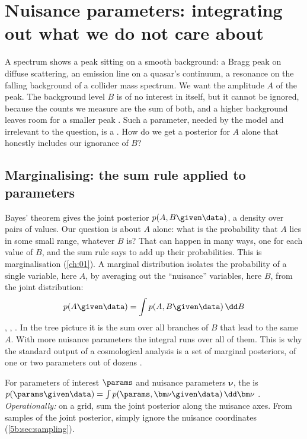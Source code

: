 \section{Nuisance parameters: integrating out what we do not care about}
\label{5b:sec:marginal}

A spectrum shows a peak sitting on a smooth background: a Bragg peak on diffuse
scattering, an emission line on a quasar's continuum, a resonance on the falling
background of a collider mass spectrum. We want the amplitude $A$ of the peak. The
background level $B$ is of no interest in itself, but it cannot be ignored, because the
counts we measure are the sum of both, and a higher background leaves room for a
smaller peak . Such a parameter, needed by the model and irrelevant
to the question, is a . How do we get a posterior for $A$
alone that honestly includes our ignorance of $B$?

\subsection{Marginalising: the sum rule applied to parameters}

Bayes' theorem gives the joint posterior $p(A,B\given\data)$, a density over pairs of
values. Our question is about $A$ alone: what is the probability that $A$ lies in some
small range, whatever $B$ is? That can happen in many ways, one for each value of $B$,
and the sum rule says to add up their probabilities. This is marginalisation
(\cref{ch:01}). A marginal distribution isolates the probability of a single variable,
here $A$, by averaging out the ``nuisance'' variables, here $B$, from the joint
distribution:
\begin{equation}
  p(A\given\data)=\int p(A,B\given\data)\,\dd B
  \label{5b:eq:marg}
\end{equation}
, , . In the tree
picture it is the sum over all branches of $B$ that lead to the same $A$. With more
nuisance parameters the integral runs over all of them. This is why the standard output
of a cosmological analysis is a set of marginal posteriors, of one or two parameters
out of dozens .

\begin{workdef}
For parameters of interest $\params$ and nuisance parameters $\bm\nu$, the
 is $p(\params\given\data)=\int p(\params,\bm\nu\given\data)\,
\dd\bm\nu$ . \emph{Operationally:} on a grid, sum
the joint posterior along the nuisance axes. From samples of the joint posterior,
simply ignore the nuisance coordinates (\cref{5b:sec:sampling}).
\end{workdef}

